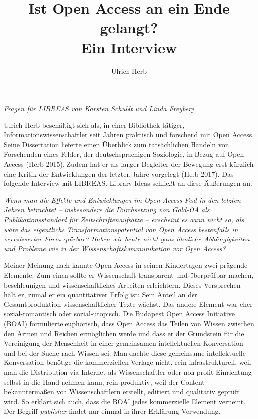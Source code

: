 \documentclass[a4paper,
fontsize=11pt,
oneside,
numbers=noperiodatend,
parskip=half-,
bibliography=totoc,
final
]{scrartcl}
\title{\LARGE{Ist Open Access an ein Ende gelangt? \\ Ein Interview}} %
\author{Ulrich Herb} %
\date{}
\begin{document}
\maketitle
\thispagestyle{fancyplain} 


\emph{Fragen für LIBREAS von Karsten Schuldt und Linda Freyberg}

Ulrich Herb beschäftigt sich als, in einer Bibliothek tätiger,
Informationswissenschaftler seit Jahren praktisch und forschend mit Open
Access. Seine Dissertation lieferte einen Überblick zum tatsächlichen
Handeln von Forschenden eines Felder, der deutschsprachigen Soziologie,
in Bezug auf Open Access (Herb 2015). Zudem hat er als langer Begleiter
der Bewegung erst kürzlich eine Kritik der Entwicklungen der letzten
Jahre vorgelegt (Herb 2017). Das folgende Interview mit LIBREAS. Library
Ideas schließt an diese Äußerungen an.

\emph{Wenn man die Effekte und Entwicklungen im Open Access-Feld in den
letzten Jahren betrachtet -- insbesondere die Durchsetzung von Gold-OA
als Publikationsstandard für Zeitschriftenaufsätze -- erscheint es dann
nicht so, als wäre das eigentliche Transformationspotential von Open
Access bestenfalls in verwässerter Form spürbar? Haben wir heute nicht
ganz ähnliche Abhängigkeiten und Probleme wie in der
Wissenschaftskommunikation vor Open Access?}

Meiner Meinung nach kannte Open Access in seinen Kindertagen zwei
prägende Elemente: Zum einen sollte er Wissenschaft transparent und
überprüfbar machen, beschleunigen und wissenschaftliches Arbeiten
erleichtern. Dieses Versprechen hält er, zumal er ein quantitativer
Erfolg ist: Sein Anteil an der Gesamtproduktion wissenschaftlicher Texte
wächst. Das andere Element war eher sozial-romantisch oder
sozial-utopisch. Die Budapest Open Access Initiative (BOAI) formulierte
euphorisch, dass Open Access das Teilen von Wissen zwischen den Armen
und Reichen ermöglichen werde und dass er der Grundstein für die
Vereinigung der Menschheit in einer gemeinsamen intellektuellen
Konversation und bei der Suche nach Wissen sei. Man dachte diese
gemeinsame intellektuelle Konversation benötige die kommerziellen
Verlage nicht, rein infrastrukturell, weil man die Distribution via
Internet als Wissenschaftler oder non-profit-Einrichtung selbst in die
Hand nehmen kann, rein produktiv, weil der Content bekanntermaßen von
Wissenschaftlern erstellt, editiert und qualitativ geprüft wird. So
erklärt sich auch, dass die BOAI jedes kommerzielle Element verneint.
Der Begriff \emph{publisher} findet nur einmal in ihrer Erklärung
Verwendung.
\end{document}

